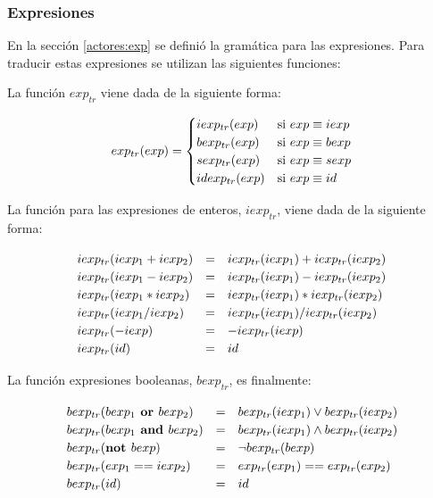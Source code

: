 \subsubsection*{Expresiones}

En la sección \ref{actores:exp} se definió la gramática para las expresiones. Para traducir estas expresiones se utilizan las siguientes funciones:

La función $exp_{tr}$ viene dada de la siguiente forma:

\begin{equation*}
  exp_{tr}(exp) =
  \setlength{\arraycolsep}{0pt}
  \renewcommand{\arraystretch}{1.2}
  \left\{\begin{array}{l @{\quad} l}
        iexp_{tr}(exp)    & \text{si $exp \equiv iexp$} \\
        bexp_{tr}(exp)    & \text{si $exp \equiv bexp$} \\
        sexp_{tr}(exp)    & \text{si $exp \equiv sexp$} \\
        idexp_{tr}(exp)   & \text{si $exp \equiv id$} \\
  \end{array}\right.
\end{equation*}

La función para las expresiones de enteros, $iexp_{tr}$, viene dada de la siguiente forma:

\begin{equation*}
\begin{array}{l c l}
iexp_{tr}(iexp_1 + iexp_2) &=& iexp_{tr}(iexp_1) + iexp_{tr}(iexp_2) \\
iexp_{tr}(iexp_1 - iexp_2) &=& iexp_{tr}(iexp_1) - iexp_{tr}(iexp_2) \\
iexp_{tr}(iexp_1 * iexp_2) &=& iexp_{tr}(iexp_1) * iexp_{tr}(iexp_2) \\ 
iexp_{tr}(iexp_1 / iexp_2) &=& iexp_{tr}(iexp_1) / iexp_{tr}(iexp_2) \\
iexp_{tr}(- iexp) &=& - iexp_{tr}(iexp) \\
iexp_{tr}(id) &=& id
\end{array}
\end{equation*}

La función expresiones booleanas, $bexp_{tr}$, es finalmente:

\begin{equation*}
\begin{array}{l c l}
bexp_{tr}(bexp_1 \textbf{ or } bexp_2) &=& bexp_{tr}(iexp_1) \vee bexp_{tr}(iexp_2) \\
bexp_{tr}(bexp_1 \textbf{ and } bexp_2) &=& bexp_{tr}(iexp_1) \wedge bexp_{tr}(iexp_2) \\
bexp_{tr}(\textbf{not } bexp) &=& \neg bexp_{tr}(bexp) \\ 
bexp_{tr}(exp_1 == iexp_2) &=& exp_{tr}(exp_1) == exp_{tr}(exp_2) \\
bexp_{tr}(id) &=& id
\end{array}
\end{equation*}

